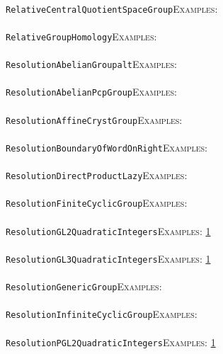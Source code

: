\documentclass[a4paper,11pt]{report}
\begin{document}
{{ \\
 \texttt{RelativeCentralQuotientSpaceGroup}{\nobreakspace}{\nobreakspace}{\nobreakspace}{\nobreakspace}\textsc{Examples:} \\
 \\
 \texttt{RelativeGroupHomology}{\nobreakspace}{\nobreakspace}{\nobreakspace}{\nobreakspace}\textsc{Examples:} \\
 \\
 \texttt{ResolutionAbelianGroup{\textunderscore}alt}{\nobreakspace}{\nobreakspace}{\nobreakspace}{\nobreakspace}\textsc{Examples:} \\
 \\
 \texttt{ResolutionAbelianPcpGroup}{\nobreakspace}{\nobreakspace}{\nobreakspace}{\nobreakspace}\textsc{Examples:} \\
 \\
 \texttt{ResolutionAffineCrystGroup}{\nobreakspace}{\nobreakspace}{\nobreakspace}{\nobreakspace}\textsc{Examples:} \\
 \\
 \texttt{ResolutionBoundaryOfWordOnRight}{\nobreakspace}{\nobreakspace}{\nobreakspace}{\nobreakspace}\textsc{Examples:} \\
 \\
 \texttt{ResolutionDirectProductLazy}{\nobreakspace}{\nobreakspace}{\nobreakspace}{\nobreakspace}\textsc{Examples:} \\
 \\
 \texttt{ResolutionFiniteCyclicGroup}{\nobreakspace}{\nobreakspace}{\nobreakspace}{\nobreakspace}\textsc{Examples:} \\
 \\
 \texttt{ResolutionGL2QuadraticIntegers}{\nobreakspace}{\nobreakspace}{\nobreakspace}{\nobreakspace}\textsc{Examples:} \href{tutorial/chap10.html} {1}{\nobreakspace} \\
 \\
 \texttt{ResolutionGL3QuadraticIntegers}{\nobreakspace}{\nobreakspace}{\nobreakspace}{\nobreakspace}\textsc{Examples:} \href{tutorial/chap10.html} {1}{\nobreakspace} \\
 \\
 \texttt{ResolutionGenericGroup}{\nobreakspace}{\nobreakspace}{\nobreakspace}{\nobreakspace}\textsc{Examples:} \\
 \\
 \texttt{ResolutionInfiniteCyclicGroup}{\nobreakspace}{\nobreakspace}{\nobreakspace}{\nobreakspace}\textsc{Examples:} \\
 \\
 \texttt{ResolutionPGL2QuadraticIntegers}{\nobreakspace}{\nobreakspace}{\nobreakspace}{\nobreakspace}\textsc{Examples:} \href{tutorial/chap10.html} {1}{\nobreakspace} \\
}}
\end{document}

